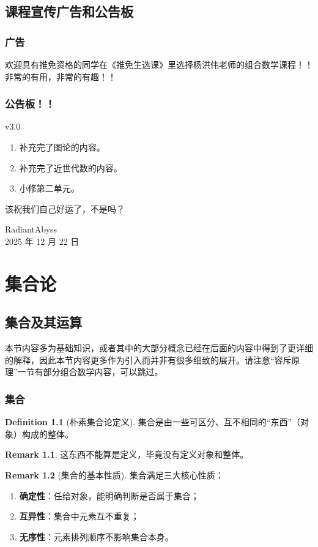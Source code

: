 \documentclass[oneside]{book}
\theoremstyle{definition}
\newtheorem{definition}{Definition}[section]
\newtheorem{remark}{Remark}[section]
\begin{document}
	\chapter*{课程宣传广告和公告板}
	\section*{广告}
	欢迎具有推免资格的同学在《推免生选课》里选择杨洪伟老师的组合数学课程！！非常的有用，非常的有趣！！
	\section*{公告板！！}
	
	v3.0
	
	\begin{enumerate}
		\item 补充完了图论的内容。
		\item 补充完了近世代数的内容。
		\item 小修第二单元。
	\end{enumerate}
	该祝我们自己好运了，不是吗？
	
\hfill RadiantAbyss\\

\hfill 2025 年 12 月 22 日

	
	\tableofcontents
	\part{集合论}
	\chapter{集合及其运算}
	本节内容多为基础知识，或者其中的大部分概念已经在后面的内容中得到了更详细的解释，因此本节内容更多作为引入而并非有很多细致的展开。请注意“容斥原理”一节有部分组合数学内容，可以跳过。
	\section{集合}
	\begin{definition}[朴素集合论定义]
		集合是由一些可区分、互不相同的“东西”（对象）构成的整体。  
	\end{definition}
	\begin{remark}
		这东西不能算是定义，毕竟没有定义对象和整体。
	\end{remark}
	\begin{remark}[集合的基本性质]
		集合满足三大核心性质：  
		\begin{enumerate}
			\item \textbf{确定性}：任给对象，能明确判断是否属于集合；  
			\item \textbf{互异性}：集合中元素互不重复；  
			\item \textbf{无序性}：元素排列顺序不影响集合本身。  
		\end{enumerate}
	\end{remark}
	
\end{document}
